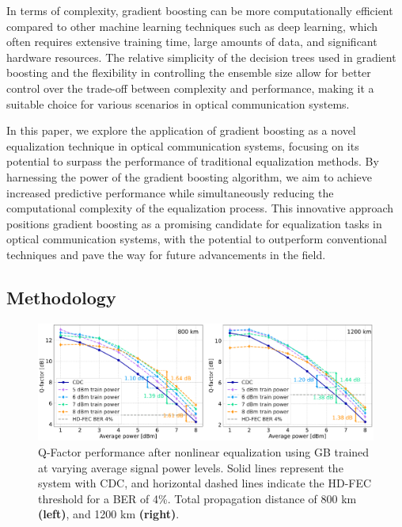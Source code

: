 In terms of complexity, gradient boosting can be more computationally efficient compared to other machine learning techniques such as deep learning, which often requires extensive training time, large amounts of data, and significant hardware resources. The relative simplicity of the decision trees used in gradient boosting and the flexibility in controlling the ensemble size allow for better control over the trade-off between complexity and performance, making it a suitable choice for various scenarios in optical communication systems.

In this paper, we explore the application of gradient boosting as a novel equalization technique in optical communication systems, focusing on its potential to surpass the performance of traditional equalization methods. By harnessing the power of the gradient boosting algorithm, we aim to achieve increased predictive performance while simultaneously reducing the computational complexity of the equalization process. This innovative approach positions gradient boosting as a promising candidate for equalization tasks in optical communication systems, with the potential to outperform conventional techniques and pave the way for future advancements in the field.


\subsection{Methodology}


\begin{figure}[ht]
   \centering
    \includegraphics[width=1\linewidth]{images/boost/q_different_models_couple.pdf}
    \caption{Q-Factor performance after nonlinear equalization using GB trained at varying average signal power levels. Solid lines represent the system with CDC, and horizontal dashed lines indicate the HD-FEC threshold for a BER of 4\%. Total propagation distance of 800 km \textbf{(left)}, and 1200 km \textbf{(right)}.}
    \label{fig:fig1}
\end{figure}

